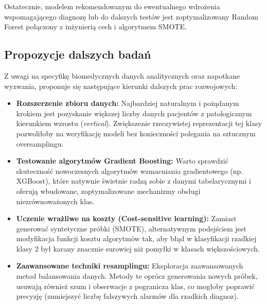 \documentclass[12pt, a4paper]{article}
\begin{document}
Ostatecznie, modelem rekomendowanym do ewentualnego wdrożenia wspomagającego diagnozę lub do dalszych testów jest zoptymalizowany Random Forest połączony z inżynierią cech i algorytmem SMOTE.

\subsection{Propozycje dalszych badań}
Z uwagi na specyfikę biomedycznych danych analitycznych oraz napotkane wyzwania, proponuje się następujące kierunki dalszych prac rozwojowych:
\begin{itemize}
    \item \textbf{Rozszerzenie zbioru danych:} Najbardziej naturalnym i pożądanym krokiem jest pozyskanie większej liczby danych pacjentów z patologicznym kierunkiem wzrostu (\textit{vertical}). Zwiększenie rzeczywistej reprezentacji tej klasy pozwoliłoby na weryfikację modeli bez konieczności polegania na sztucznym oversamplingu.
    \item \textbf{Testowanie algorytmów Gradient Boosting:} Warto sprawdzić skuteczność nowoczesnych algorytmów wzmacniania gradientowego (np. XGBoost), które natywnie świetnie radzą sobie z danymi tabelarycznymi i oferują wbudowane, zoptymalizowane mechanizmy obsługi niezrównoważonych klas.
    \item \textbf{Uczenie wrażliwe na koszty (Cost-sensitive learning):} Zamiast generować syntetyczne próbki (SMOTE), alternatywnym podejściem jest modyfikacja funkcji kosztu algorytmów tak, aby błąd w klasyfikacji rzadkiej klasy 2 był karany znacznie surowiej niż pomyłki w klasach większościowych.
    \item \textbf{Zaawansowane techniki resamplingu:} Eksploracja zaawansowanych metod balansowania danych. Metody te oprócz generowania nowych próbek, usuwają również szum i obserwacje z pogranicza klas, co mogłoby poprawić precyzję (zmniejszyć liczbę fałszywych alarmów dla rzadkich diagnoz).
\end{itemize}
\end{document}
